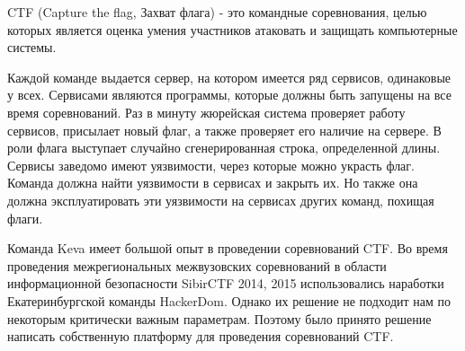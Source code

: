 CTF (Capture the flag, Захват флага) - это командные соревнования, целью которых является оценка умения участников атаковать и защищать компьютерные системы.

Каждой команде выдается сервер, на котором имеется ряд сервисов, одинаковые у всех. Сервисами являются программы, которые должны быть запущены на все время соревнований. Раз в минуту жюрейская система проверяет работу сервисов, присылает новый флаг, а также проверяет его наличие на сервере. В роли флага выступает случайно сгенерированная строка, определенной длины. Сервисы заведомо имеют уязвимости, через которые можно украсть флаг. Команда должна найти уязвимости в сервисах и закрыть их. Но также она должна эксплуатировать эти уязвимости на сервисах других команд, похищая флаги. 

Команда Keva имеет большой опыт в проведении соревнований CTF. Во время проведения межрегиональных межвузовских соревнований в области информационной безопасности SibirCTF 2014, 2015 использовались наработки Екатеринбургской команды HackerDom. Однако их решение не подходит нам по некоторым критически важным параметрам. Поэтому  было принято решение написать собственную платформу для проведения соревнований CTF.

